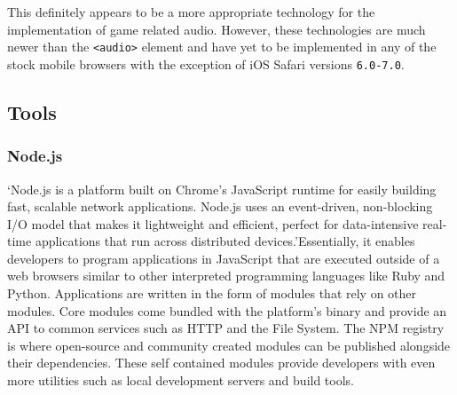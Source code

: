 \documentclass[final]{cmpreport}
\begin{document}

This definitely appears to be a more appropriate technology for the implementation of game related audio. However, these technologies are much newer than the \texttt{<audio>} element and have yet to be implemented in any of the stock mobile browsers with the exception of iOS Safari versions \texttt{6.0-7.0\footnotemark}.


\subsection{Tools}

\subsubsection{Node.js}
`Node.js is a platform built on Chrome's JavaScript runtime for easily building fast, scalable network applications. Node.js uses an event-driven, non-blocking I/O model that makes it lightweight and efficient, perfect for data-intensive real-time applications that run across distributed devices.'\footnotemark Essentially, it enables developers to program applications in JavaScript that are executed outside of a web browsers similar to other interpreted programming languages like Ruby and Python. Applications are written in the form of modules that rely on other modules. Core modules come bundled with the platform's binary and provide an API to common services such as HTTP and the File System. The NPM registry is where open-source and community created modules can be published alongside their dependencies. These self contained modules provide developers with even more utilities such as local development servers and build tools.

\end{document}
